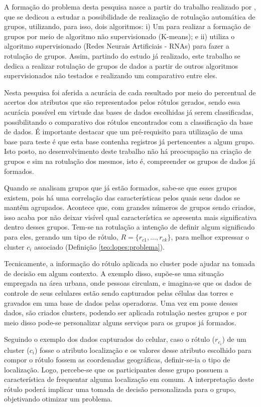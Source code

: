 A formação do problema desta pesquisa nasce a partir do trabalho realizado por \cite{Lopes2016}, que se dedicou a estudar a possibilidade de realização de rotulação automática de grupos, utilizando, para isso, dois algoritmos: i) Um para realizar a formação de grupos por meio de algoritmo não supervisionado (K-means); e ii) utiliza o algoritmo supervisionado (Redes Neurais Artificiais - RNAs) para fazer a rotulação de grupos. Assim, partindo do estudo já realizado, este trabalho se dedica a realizar rotulação de grupos de dados a partir de outros algoritmos supervisionados não testados e realizando um comparativo entre eles. 

Nesta pesquisa foi aferida a acurácia de cada resultado por meio do percentual de acertos dos atributos que são representados pelos rótulos gerados, sendo essa acurácia possível em virtude das bases de dados escolhidas já serem classificadas, possibilitando o comparativo dos rótulos encontrados com a classificação da base de dados. É importante destacar que um pré-requisito para utilização de uma base para teste é que esta base contenha registros já pertencentes a algum grupo. Isto posto, no desenvolvimento deste trabalho não há preocupação na criação de grupos e sim na rotulação dos mesmos, isto é, compreender os grupos de dados já formados. 

Quando se analisam grupos que já estão formados, sabe-se que esses grupos existem, pois há uma correlação das características pelos quais seus dados se mantêm agrupados. Acontece que, com grandes números de grupos sendo criados, isso acaba por não deixar visível qual característica se apresenta mais significativa dentro desses grupos. Tem-se na rotulação a intenção de definir algum significado para eles, gerando um tipo de rótulo, ${ R=\{ r_{c1},...,r_{ck} \} }$, para melhor expressar o cluster ${c_i}$ associado (Definição \ref{teo:lopes:problema}).

Tecnicamente, a informação do rótulo aplicada no cluster pode ajudar na tomada de decisão em algum contexto. A exemplo disso, supõe-se uma situação empregada na área urbana, onde pessoas circulam, e imagina-se que os dados de controle de seus celulares estão sendo capturados pelas células das torres e gravados em uma base de dados pelas operadoras. Uma vez em posse desses dados, são criados clusters, podendo ser aplicada rotulação nestes grupos e por meio disso pode-se personalizar alguns serviços para os grupos já formados.

Seguindo o exemplo dos dados capturados do celular, caso o rótulo (${r_{c_i}}$) de um cluster (${c_i}$) fosse o atributo localização e os valores desse atributo escolhido para compor o rótulo fossem as coordenadas geográficas, definir-se-ia o tipo de localização. Logo, percebe-se que os participantes desse grupo possuem a característica de frequentar alguma localização em comum. A interpretação deste rótulo poderá implicar uma tomada de decisão personalizada para o grupo, objetivando otimizar um problema. 

